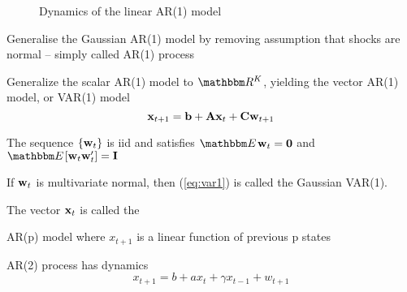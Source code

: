 \begin{frame}

    \vspace{2em}
    \begin{figure}
       \begin{center}
        \caption{Dynamics of the linear AR(1) model}
       \end{center}
    \end{figure}

\end{frame}



\begin{frame}

    \vspace{2em}
    Generalise the Gaussian AR(1) model by removing assumption that shocks are normal
    -- simply called AR(1) process

\end{frame}

\begin{frame}
    
    \vspace{2em}
    Generalize the scalar AR(1) model to $\RR^K$, yielding the vector
    AR(1) model, or VAR(1) model
    \begin{equation}
    \label{eq:var1}
        {\mathbf x}_{t+1} = {\mathbf b} + \mathbf A {\mathbf x}_t + \mathbf C {\mathbf w}_{t+1}
    \end{equation}
    
    \vspace{1em}
    The sequence $\{ {\mathbf w}_t \}$ is {\sc iid} and satisfies
    $\EE \boldw_t = \boldzero$ and $\EE[\boldw_t\boldw_t'] = \boldI$
    
    If ${\mathbf w}_t$ is multivariate normal, then
    (\ref{eq:var1}) is called the Gaussian VAR(1). 
    
    The vector
    ${\mathbf x}_t$ is called the  
    
\end{frame}

\begin{frame}

    \vspace{2em}
    AR(p) model where $x_{t+1}$ is a linear function of previous p states
    
    \vspace{1em}
    AR(2) process has dynamics
%
    \begin{equation*}
        x_{t+1} = b + a x_t + \gamma x_{t-1} + w_{t+1}
    \end{equation*}

\end{frame}

